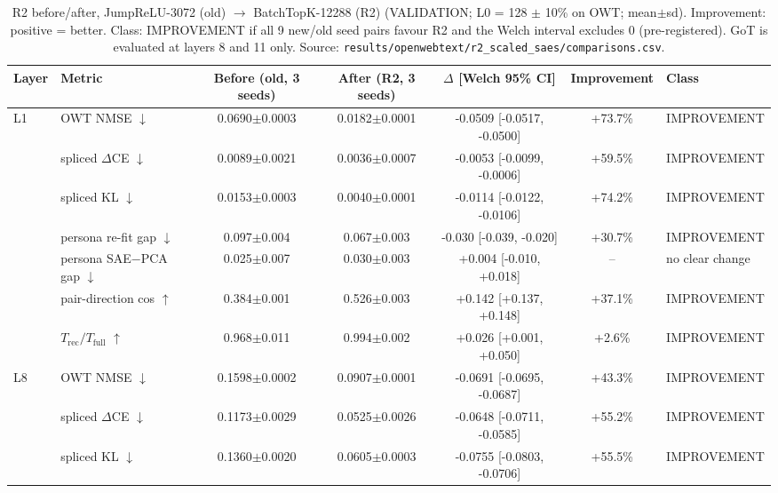 \begin{table}[t]
\centering
\small
\caption{R2 before/after, JumpReLU-3072 (old) $\rightarrow$ BatchTopK-12288 (R2) (VALIDATION; L0 = 128 $\pm$ 10\% on OWT; mean$\pm$sd). Improvement: positive = better. Class: IMPROVEMENT if all 9 new/old seed pairs favour R2 and the Welch interval excludes 0 (pre-registered). GoT is evaluated at layers 8 and 11 only. Source: \texttt{results/\allowbreak{}openwebtext/\allowbreak{}r2\_scaled\_saes/\allowbreak{}comparisons.csv}.}
\label{tab:r2_c3}
\begin{adjustbox}{max width=\linewidth}
\begin{tabular}{llccccl}
\toprule
Layer & Metric & Before (old, 3 seeds) & After (R2, 3 seeds) & $\Delta$ [Welch 95\% CI] & Improvement & Class \\
\midrule
L1 & OWT NMSE $\downarrow$ & 0.0690$\pm$0.0003 & 0.0182$\pm$0.0001 & -0.0509 [-0.0517, -0.0500] & +73.7\% & IMPROVEMENT \\
 & spliced $\Delta$CE $\downarrow$ & 0.0089$\pm$0.0021 & 0.0036$\pm$0.0007 & -0.0053 [-0.0099, -0.0006] & +59.5\% & IMPROVEMENT \\
 & spliced KL $\downarrow$ & 0.0153$\pm$0.0003 & 0.0040$\pm$0.0001 & -0.0114 [-0.0122, -0.0106] & +74.2\% & IMPROVEMENT \\
 & persona re-fit gap $\downarrow$ & 0.097$\pm$0.004 & 0.067$\pm$0.003 & -0.030 [-0.039, -0.020] & +30.7\% & IMPROVEMENT \\
 & persona SAE$-$PCA gap $\downarrow$ & 0.025$\pm$0.007 & 0.030$\pm$0.003 & +0.004 [-0.010, +0.018] & -- & no clear change \\
 & pair-direction cos $\uparrow$ & 0.384$\pm$0.001 & 0.526$\pm$0.003 & +0.142 [+0.137, +0.148] & +37.1\% & IMPROVEMENT \\
 & $T_{\text{rec}}/T_{\text{full}}$ $\uparrow$ & 0.968$\pm$0.011 & 0.994$\pm$0.002 & +0.026 [+0.001, +0.050] & +2.6\% & IMPROVEMENT \\
\midrule
L8 & OWT NMSE $\downarrow$ & 0.1598$\pm$0.0002 & 0.0907$\pm$0.0001 & -0.0691 [-0.0695, -0.0687] & +43.3\% & IMPROVEMENT \\
 & spliced $\Delta$CE $\downarrow$ & 0.1173$\pm$0.0029 & 0.0525$\pm$0.0026 & -0.0648 [-0.0711, -0.0585] & +55.2\% & IMPROVEMENT \\
 & spliced KL $\downarrow$ & 0.1360$\pm$0.0020 & 0.0605$\pm$0.0003 & -0.0755 [-0.0803, -0.0706] & +55.5\% & IMPROVEMENT \\

\end{tabular}
\end{adjustbox}
\end{table}
